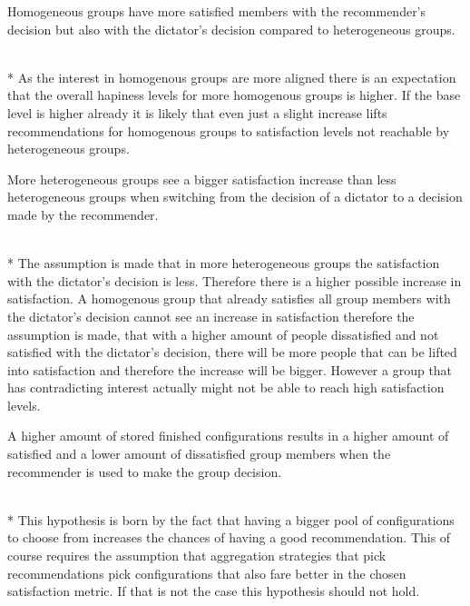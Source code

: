 \begin{hypothesis}
    \begin{itshape}
        \label{hyp:Evaluation:HomogenousMoreSatisfied} Homogeneous groups have more satisfied members with the recommender's decision but also with the dictator's decision compared to heterogeneous groups.
    \end{itshape} \medskip \\*
    As the interest in homogenous groups are more aligned there is an expectation that the overall hapiness levels for more homogenous groups is higher. If the base level is higher already it is likely that even just a slight increase lifts recommendations for homogenous groups to satisfaction levels not reachable by heterogeneous groups.
\end{hypothesis}

\begin{hypothesis}
    \begin{itshape}
        \label{hyp:Evaluation:HeterogenousBiggerSatisfactionIncrease} More heterogeneous groups see a bigger satisfaction increase than less heterogeneous groups when switching from the decision of a dictator to a decision made by the recommender.
    \end{itshape} \medskip \\*
    The assumption is made that in more heterogeneous groups the satisfaction with the dictator's decision is less. Therefore there is a higher possible increase in satisfaction. A homogenous group that already satisfies all group members with the dictator's decision cannot see an increase in satisfaction therefore the assumption is made, that with a higher amount of people dissatisfied and not satisfied with the dictator's decision, there will be more people that can be lifted into satisfaction and therefore the increase will be bigger. However a group that has contradicting interest actually might not be able to reach high satisfaction levels.
\end{hypothesis}

\begin{hypothesis}
    \begin{itshape}
        \label{hyp:Evaluation:StoreSizeBetterResults} A higher amount of stored finished configurations results in a higher amount of satisfied and a lower amount of dissatisfied group members when the recommender is used to make the group decision.
    \end{itshape} \medskip \\*
    This hypothesis is born by the fact that having a bigger pool of configurations to choose from increases the chances of having a good recommendation. This of course requires the assumption that aggregation strategies that pick recommendations pick configurations that also fare better in the chosen satisfaction metric. If that is not the case this hypothesis should not hold.
\end{hypothesis}


